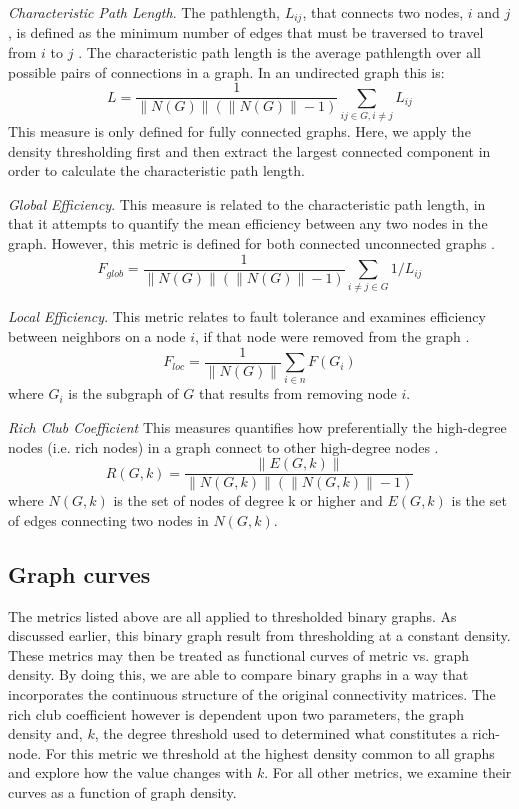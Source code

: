 \documentclass{frontiersSCNS} %
\begin{document}
\emph{Characteristic Path Length}. The pathlength, $L_{ij}$, that connects two nodes, $i$ and $j$, is defined as the minimum number of edges that must be traversed to travel from $i$ to $j$ \citep{Dijkstra1959}. The characteristic path length is the average pathlength over all possible pairs of connections in a graph. In an undirected graph this is:
$$L = \frac{1}{\|N(G)\|(\|N(G)\|-1)} \sum_{ij \in G, i \neq j}{L_{ij}}$$
This measure is only defined for fully connected graphs. Here, we apply the density thresholding first and then extract the largest connected component in order to calculate the characteristic path length.

\emph{Global Efficiency}. This measure is related to the characteristic path length, in that it attempts to quantify the mean efficiency between any two nodes in the graph. However, this metric is defined for both connected unconnected graphs \citep{Latora2001}.
$$F_{glob} = \frac{1}{\|N(G)\|(\|N(G)\|-1)} \sum_{i \neq j \in G}{1/L_{ij}}$$


\emph{Local Efficiency}. This metric relates to fault tolerance and examines efficiency between neighbors on a node $i$, if that node were removed from the graph \citep{Latora2001}.
$$F_{loc} = \frac{1}{\|N(G)\|} \sum_{i \in n}{F(G_i)}$$
where $G_i$ is the subgraph of $G$ that results from removing node $i$.

\emph{Rich Club Coefficient}
This measures quantifies how preferentially the high-degree nodes (i.e. rich nodes)  in a graph connect to other high-degree nodes \citep{RichClub}.
$$ R(G,k) = \frac{ \|E(G,k)\| }{ \|N(G,k)\| ( \|N(G,k)\|-1 ) } $$
where $N(G,k)$ is the set of nodes of degree k or higher and $E(G,k)$ is the set of edges connecting two nodes in $N(G,k)$.


\subsection{Graph curves}
The metrics listed above are all applied to thresholded binary graphs. As discussed earlier, this binary graph result from thresholding at a constant density. These metrics may then be treated as functional curves of metric vs. graph density. By doing this, we are able to compare binary graphs in a way that incorporates the continuous structure of the original connectivity matrices. The rich club coefficient however is dependent upon two parameters, the graph density and, $k$, the degree threshold used to determined what constitutes a rich-node. For this metric we threshold at the highest density common to all graphs and explore how the value changes with $k$. For all other metrics, we examine their curves as a function of graph density. 
\end{document}

